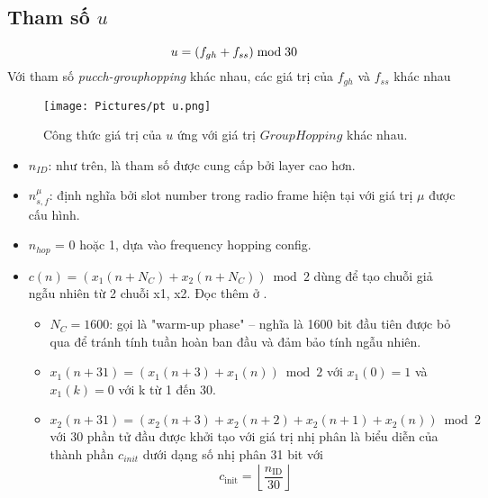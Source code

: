 \subsection{Tham số $u$}
 \[ u = (f_{gh}+f_{ss})\space \bmod \space 30 \]
  Với tham số \textit{pucch-grouphopping} khác nhau, các giá trị của $f_{gh}$ và $f_{ss}$ khác nhau
  \begin{figure}[H]
      \centering
      \texttt{[image: Pictures/pt u.png]}
      \caption{Công thức giá trị của $u$ ứng với giá trị $GroupHopping$ khác nhau. \cite{ShareTechnote_5G_Waveform}}
  \end{figure}
\begin{itemize}
    \item $n_{ID}$: như trên, là tham số được cung cấp bởi layer cao hơn.
    \item $n^\mu_{s,f}$: định nghĩa bởi slot number trong radio frame hiện tại với giá trị $\mu$ được cấu hình.
    \item $n_{hop}$ = 0 hoặc 1, dựa vào frequency hopping config.
    \item $c(n) = (x_1(n + N_C)+x_2(n + N_C)) \bmod 2$ dùng để tạo chuỗi giả ngẫu nhiên từ 2 chuỗi x1, x2. Đọc thêm ở \cite{3gpp38211PRBS}.
    \begin{itemize}
        \item $N_C=1600$: gọi là "warm-up phase" – nghĩa là 1600 bit đầu tiên được bỏ qua để tránh tính tuần hoàn ban đầu và đảm bảo tính ngẫu nhiên.
        \item $x_1 (n+31)=(x_1 (n+3)+x_1 (n))\bmod2$ với $x_1(0)=1$ và $x_1(k)=0$ với k từ 1 đến 30.
        \item $x_2(n+31)=(x_2(n+3)+x_2(n+2)+x_2(n+1)+x_2(n))\bmod2$ với 30 phần tử đầu được khởi tạo với giá trị nhị phân là biểu diễn của thành phần $c_{init}$ dưới dạng số nhị phân 31 bit với $$c_{\text{init}} = \left\lfloor \frac{n_{\text{ID}}}{30} \right\rfloor
$$
    \end{itemize}
\end{itemize}
